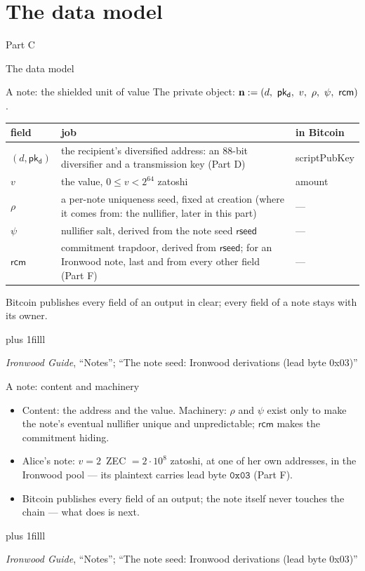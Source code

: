 \documentclass[aspectratio=169,11pt]{beamer}
\newcommand{\pkd}{\ensuremath{\mathsf{pk_d}}}
\newcommand{\rcm}{\ensuremath{\mathsf{rcm}}}
\newcommand{\divider}[2]{%
  \section{#2}
  \begin{frame}[plain,t]
  \vspace*{14mm}
  {\small\color{arb}#1\par}
  \vskip8mm
  \begin{minipage}{0.88\textwidth}\raggedright
    \fontsize{27}{31}\selectfont #2\par
  \end{minipage}
  \end{frame}}
\newcommand{\src}[1]{\par\vskip0pt plus 1filll
  {\fontsize{6}{7.2}\selectfont\color{arbdim}\raggedright #1\par}}
\begin{document}
\divider{Part C}{The data model}

\begin{frame}{A note: the shielded unit of value}
The private object: $\Cnote := (d,\ \pkd,\ v,\ \rho,\ \psi,\ \rcm)$.
\par\medskip
{\small\centering
\begin{tabular}{@{}lp{7.6cm}l@{}}
\toprule
field & job & in Bitcoin \\
\midrule
$(d, \pkd)$ & the recipient's diversified address: an $88$-bit
  diversifier and a transmission key (Part D) & \textsf{scriptPubKey} \\
$v$ & the value, $0 \le v < 2^{64}$ zatoshi & \textsf{amount} \\
$\rho$ & a per-note uniqueness seed, fixed at creation (where it comes
  from: the nullifier, later in this part) & --- \\
$\psi$ & nullifier salt, derived from the note seed $\mathsf{rseed}$ &
  --- \\
$\rcm$ & commitment trapdoor, derived from $\mathsf{rseed}$; for an
  Ironwood note, last and from every other field (Part F) & --- \\
\bottomrule
\end{tabular}\par}
\medskip
Bitcoin publishes every field of an output in clear; every field of a
note stays with its owner.
\src{\emph{Ironwood Guide}, ``Notes'';
  ``The note seed: Ironwood derivations (lead byte 0x03)''}
\end{frame}

\begin{frame}{A note: content and machinery}
\begin{itemize}
  \item Content: the address and the value. Machinery: $\rho$ and
    $\psi$ exist only to make the note's eventual nullifier unique and
    unpredictable; $\rcm$ makes the commitment hiding.
  \item Alice's note: $v = 2$~ZEC $= 2 \cdot 10^{8}$ zatoshi, at one of
    her own addresses, in the Ironwood pool --- its plaintext carries
    lead byte $\mathtt{0x03}$ (Part F).
  \item Bitcoin publishes every field of an output; the note itself
    never touches the chain --- what does is next.
\end{itemize}
\src{\emph{Ironwood Guide}, ``Notes'';
  ``The note seed: Ironwood derivations (lead byte 0x03)''}
\end{frame}
\end{document}

